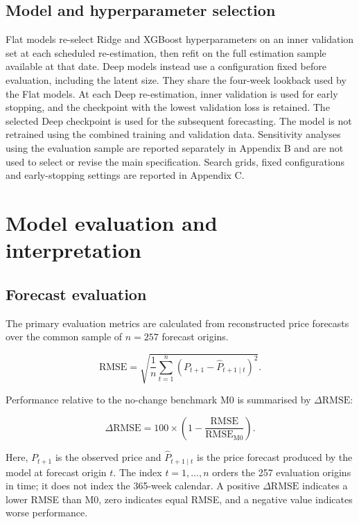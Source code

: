 \documentclass[
  british,
  12pt,
  oneside]{book}
\begin{document}
\subsection{Model and hyperparameter selection}\label{method-hyperparams}

Flat models re-select Ridge and XGBoost hyperparameters on an inner validation set at each scheduled re-estimation, then refit on the full estimation sample available at that date. Deep models instead use a configuration fixed before evaluation, including the latent size. They share the four-week lookback used by the Flat models. At each Deep re-estimation, inner validation is used for early stopping, and the checkpoint with the lowest validation loss is retained. The selected Deep checkpoint is used for the subsequent forecasting. The model is not retrained using the combined training and validation data. Sensitivity analyses using the evaluation sample are reported separately in Appendix B and are not used to select or revise the main specification. Search grids, fixed configurations and early-stopping settings are reported in Appendix C.

\section{Model evaluation and interpretation}\label{method-eval}

\subsection{Forecast evaluation}\label{method-metrics}

The primary evaluation metrics are calculated from reconstructed price forecasts over the common sample of \(n=257\) forecast origins.

\begin{equation}
\mathrm{RMSE}=
\sqrt{
\frac{1}{n}
\sum_{t=1}^{n}
\left(P_{t+1}-\hat{P}_{t+1\mid t}\right)^2
}.
\label{eq:rmse}
\end{equation}

Performance relative to the no-change benchmark M0 is summarised by \(\Delta\mathrm{RMSE}\):

\begin{equation}
\Delta\mathrm{RMSE}
=
100\times\left(1-\frac{\mathrm{RMSE}}{\mathrm{RMSE}_{\mathrm{M0}}}\right).
\label{eq:rmse-improv}
\end{equation}

Here, \(P_{t+1}\) is the observed price and \(\hat{P}_{t+1\mid t}\) is the price forecast produced by the model at forecast origin \(t\). The index \(t=1,\ldots,n\) orders the 257 evaluation origins in time; it does not index the 365-week calendar. A positive \(\Delta\mathrm{RMSE}\) indicates a lower RMSE than M0, zero indicates equal RMSE, and a negative value indicates worse performance.
\end{document}
